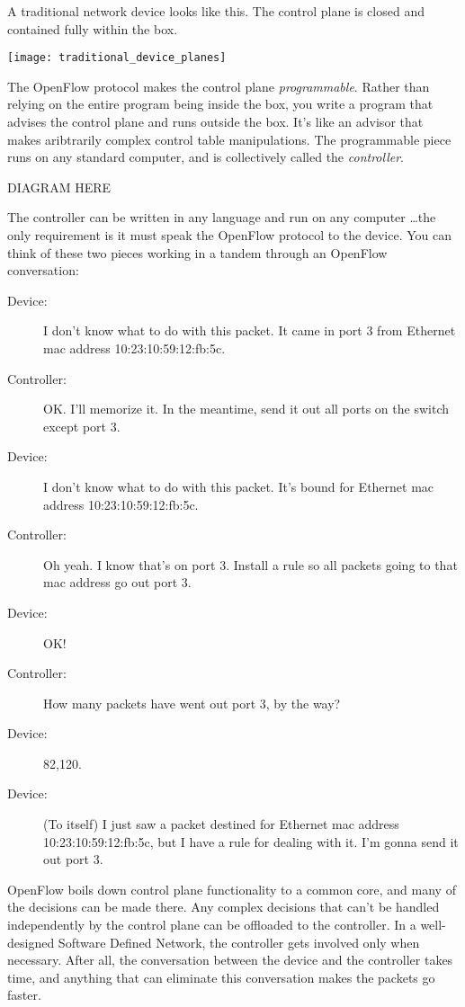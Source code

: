 A traditional network device looks like this. 
The control plane is closed and contained fully within the box.

\texttt{[image: traditional\_device\_planes]}

The OpenFlow protocol makes the control plane \textit{programmable}.
Rather than relying on the entire program being inside the box, you write a program that advises the control plane
and runs outside the box.
It's like an advisor that makes aribtrarily complex control table manipulations.  
The programmable piece runs on any standard computer, and is collectively called the \textit{controller}.  

DIAGRAM HERE

The controller can be written in any language and run on any computer \ldots the only requirement is it must speak the
OpenFlow protocol to the device.  
You can think of these two pieces working in a tandem through an OpenFlow conversation:

\begin{description}
\item[Device:] I don't know what to do with this packet.  It came in port 3 from Ethernet mac address 10:23:10:59:12:fb:5c.
\item[Controller:] OK.  I'll memorize it.  In the meantime, send it out all ports on the switch except port 3.  
\item[Device:] I don't know what to do with this packet.  It's bound for Ethernet mac address 10:23:10:59:12:fb:5c.
\item[Controller:]  Oh yeah.  I know that's on port 3.  Install a rule so all packets going to that mac address go out port 3.
\item[Device:] OK!
\item[Controller:] How many packets have went out port 3, by the way?
\item[Device:] 82,120.
\item[Device:] (To itself) I just saw a packet destined for Ethernet mac address 10:23:10:59:12:fb:5c, but I have a rule for dealing with it.  I'm gonna send it out port 3.  
\end{description}

OpenFlow boils down control plane functionality to a common core, and many of the decisions can be made there.
Any complex decisions that can't be handled independently by the control plane can be offloaded to the controller.  
In a well-designed Software Defined Network, the controller gets involved only when necessary.
After all, the conversation between the device and the controller takes time, and anything that can 
eliminate this conversation makes the packets go faster.

